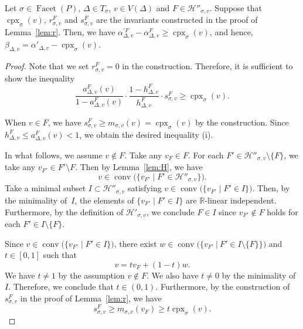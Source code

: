 \begin{lem}\label{lem:rsineq}
Let $\sigma \in \operatorname{Facet}(P)$, $\Delta \in T_{\sigma}$, $v \in V(\Delta)$ and $F \in \mathcal{H}'' _{\sigma, v}$. 
Suppose that $\operatorname{cpx}_{\sigma}(v)$, $r_{\sigma, v}^F$ and $s_{\sigma, v}^F$ are the invariants constructed in the proof of Lemma~\ref{lem:r}. 
Then, we have 
$\alpha ^{\prime F} _{\Delta, v} - \alpha ^{F} _{\Delta, v} \ge \operatorname{cpx}_{\sigma}(v)$, 
and hence, $\beta_{\Delta, v} = \alpha ' _{\Delta, v} - \operatorname{cpx}_{\sigma}(v)$. 
\end{lem}
\begin{proof}
Note that we set $r_{\sigma, v}^F = 0$ in the construction. Therefore, it is sufficient to show the inequality
\[\tag{i}
\frac{a_{\Delta,v}^F(v)}{1-a^F _{\Delta,v}(v)} \cdot \frac{1 - h^F _{\Delta,v}}{h^F _{\Delta,v}} 
\cdot s_{\sigma, v}^F  \ge \operatorname{cpx}_{\sigma}(v). 
\]


When $v \in F$, we have $s_{\sigma, v}^F \ge m_{\sigma,v}(v) = \operatorname{cpx}_{\sigma}(v)$ by the construction. 
Since $h_{\Delta, v} ^F \le a_{\Delta, v} ^F (v) <1$, we obtain the desired inequality (i). 

In what follows, we assume $v \not\in F$. 
Take any $v_F \in F$. 
For each $F' \in \mathcal{H}'' _{\sigma, v} \setminus \{ F \}$, we take any $v_{F'} \in F' \setminus F$. 
Then by Lemma~\ref{lem:H}, we have 
\[
v \in \operatorname{conv} \bigl( \{ v_{F'} \mid F' \in \mathcal{H}'' _{\sigma, v} \}  \bigr). 
\]
Take a minimal subset $I \subset \mathcal{H}'' _{\sigma, v}$ satisfying $v \in \operatorname{conv} \bigl( \{ v_{F'} \mid F' \in I \}  \bigr)$. 
Then, by the minimality of~$I$, the elements of $\{ v_{F'} \mid F' \in I \}$ are $\mathbb{R}$-linear independent. 
Furthermore, by the definition of $\mathcal{H}' _{\sigma, v}$, we conclude $F \in I$ since $v_{F'} \not \in F$ holds for each $F' \in I \setminus \{ F \}$. 

Since  $v \in \operatorname{conv} \bigl( \{ v_{F'} \mid F' \in I \}  \bigr)$, 
there exist $w \in \operatorname{conv} \bigl( \bigl\{ v_{F'} \ \big | \  F' \in I \setminus \{ F \} \bigr\}  \bigr)$ and $t \in [0,1]$ 
such that 
\[
v = t v_F + (1-t) w. 
\]
We have $t \ne 1$ by the assumption $v \not\in F$. 
We also have $t \ne 0$ by the minimality of~$I$. 
Therefore, we conclude that $t \in (0,1)$. 
Furthermore, by the construction of $s_{\sigma, v}^F$ in the proof of Lemma~\ref{lem:r}, we have 
\[\tag{ii}
s_{\sigma, v}^F \ge m_{\sigma,v}(v_F) \ge t\operatorname{cpx}_{\sigma}(v). 
\]


\end{proof}
